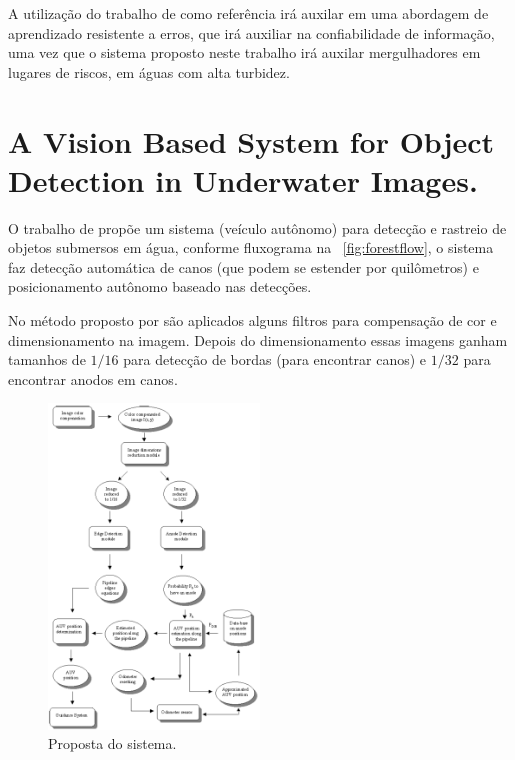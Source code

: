 A utilização do trabalho de  como referência irá auxilar em uma abordagem de aprendizado resistente a erros, que irá auxiliar na confiabilidade de informação, uma vez que o sistema proposto neste trabalho irá auxilar mergulhadores em lugares de riscos, em águas com alta turbidez. 

\section{A Vision Based System for Object Detection in Underwater Images.}

O trabalho de  propõe um sistema (veículo autônomo) para detecção e rastreio de objetos submersos em água, conforme fluxograma na ~\autoref{fig:forestflow}, o sistema faz detecção automática de canos (que podem se estender por quilômetros) e posicionamento autônomo baseado nas detecções.

No método proposto por  são aplicados alguns filtros para compensação de cor e dimensionamento na imagem. Depois do dimensionamento essas imagens ganham tamanhos de $1/16$ para detecção de bordas (para encontrar canos) e $1/32$ para encontrar anodos em canos.
\begin{figure}[h]
	\caption{\label{fig:forestflow}Proposta do sistema.}
	\begin{center}
	    \includegraphics[width=0.5\textwidth]{resources/flowchartforest}
	\end{center}
\end{figure}

